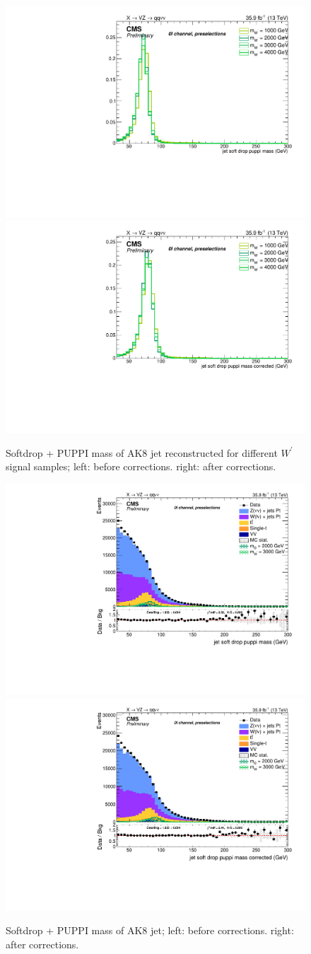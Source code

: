 \begin{figure}[!htb]
  \begin{center}
    \includegraphics[width=.495\textwidth]{plots/v9/XVZnnPre/FatJet1_softdropPuppiMass_signalWZ.pdf}
    \includegraphics[width=.495\textwidth]{plots/v9/XVZnnPre/FatJet1_softdropPuppiMassCorr_signalWZ.pdf}
  \end{center}
  \caption{Softdrop + PUPPI mass of AK8 jet reconstructed for different $W^{'}$ signal samples; left: before corrections. right: after corrections.}
  \label{fig:fatjet_pre_softdroppuppimass_ZZ}
\end{figure}

\begin{figure}[!htb]
  \begin{center}
    \includegraphics[width=.495\textwidth]{plots/v9/XVZnnPre/FatJet1_softdropPuppiMass.pdf}
    \includegraphics[width=.495\textwidth]{plots/v9/XVZnnPre/FatJet1_softdropPuppiMassCorr.pdf}
  \end{center}
  \caption{Softdrop + PUPPI mass of AK8 jet; left: before corrections. right: after corrections.}
  \label{fig:fatjet_softdroppuppimass}
\end{figure}

